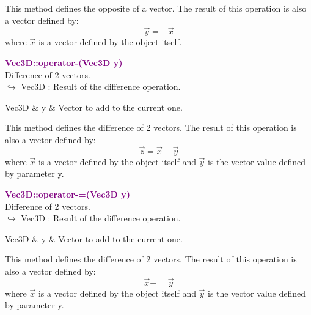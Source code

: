 This method defines the opposite of a vector.
The result of this operation is also a vector defined by:
\begin{equation*}
\overrightarrow{y} = -\overrightarrow{x}
\end{equation*}
where $\overrightarrow{x}$ is a vector defined by the object itself.

\textcolor{purple}{\textbf{Vec3D::operator-(Vec3D y)}}\label{Vec3D::operator-(Vec3D y)}\\
Difference of 2 vectors.\\ \hspace*{10mm}$\hookrightarrow$ Vec3D : Result of the difference operation.

\begin{tcolorbox}[width=\textwidth,myArgs,tabularx={ll|R}]
Vec3D & y & Vector to add to the current one.
\end{tcolorbox}

This method defines the difference of 2 vectors.
The result of this operation is also a vector defined by:
\begin{equation*}
\overrightarrow{z} = \overrightarrow{x} - \overrightarrow{y}
\end{equation*}
where $\overrightarrow{x}$ is a vector defined by the object itself and $\overrightarrow{y}$ is the vector value defined by parameter y.

\textcolor{purple}{\textbf{Vec3D::operator-=(Vec3D y)}}\label{Vec3D::operator-=(Vec3D y)}\\
Difference of 2 vectors.\\ \hspace*{10mm}$\hookrightarrow$ Vec3D : Result of the difference operation.

\begin{tcolorbox}[width=\textwidth,myArgs,tabularx={ll|R}]
Vec3D & y & Vector to add to the current one.
\end{tcolorbox}

This method defines the difference of 2 vectors.
The result of this operation is also a vector defined by:
\begin{equation*}
\overrightarrow{x} -= \overrightarrow{y}
\end{equation*}
where $\overrightarrow{x}$ is a vector defined by the object itself and $\overrightarrow{y}$ is the vector value defined by parameter y.

